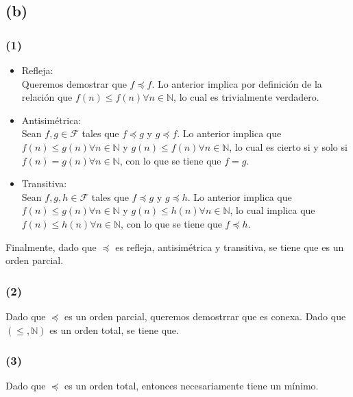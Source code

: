 \documentclass[12pt]{article}
\begin{document}
\subsection*{(b)}

\subsubsection*{(1)}
\begin{itemize}
    \item Refleja:\\
    Queremos demostrar que $f \preceq f$.
    Lo anterior implica por definición de la relación que $f(n) \leq f(n) \forall n \in \mathbb{N}$, lo cual es trivialmente verdadero.

    \item Antisimétrica:\\
    Sean $f, g \in \mathcal{F}$ tales que $f \preceq g$ y $g \preceq f$.
    Lo anterior implica que $f(n) \leq g(n) \forall n \in \mathbb{N}$ y $g(n) \leq f(n) \forall n \in \mathbb{N}$,
    lo cual es cierto si y solo si $f(n) = g(n) \forall n \in \mathbb{N}$, con lo que se tiene que $f = g$.

    \item Transitiva:\\
    Sean $f, g, h \in \mathcal{F}$ tales que $f \preceq g$ y $g \preceq h$.
    Lo anterior implica que $f(n) \leq g(n) \forall n \in \mathbb{N}$ y $g(n) \leq h(n) \forall n \in \mathbb{N}$,
    lo cual implica que $f(n) \leq h(n) \forall n \in \mathbb{N}$, con lo que se tiene que $f \preceq h$.
\end{itemize}

Finalmente, dado que $\preceq$ es refleja, antisimétrica y transitiva, se tiene que es un orden parcial.

\subsubsection*{(2)}
Dado que $\preceq$ es un orden parcial, queremos demostrrar que es conexa.
Dado que $(\leq, \mathbb{N})$ es un orden total, se tiene que.

\subsubsection*{(3)}
Dado que $\preceq$ es un orden total, entonces necesariamente tiene un mínimo.
\end{document}
